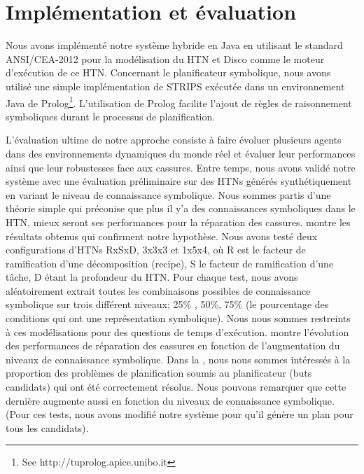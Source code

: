 \documentclass[a4paper,twoside,french]{article}
\begin{document}
	\section{Implémentation et évaluation}
	Nous avons implémenté notre système hybride en Java en utilisant le standard ANSI/CEA-2012 \cite{rich2009building} pour la modélisation du HTN et Disco \cite{rich2012using} comme le moteur d'exécution de ce HTN. Concernant le planificateur symbolique, nous avons utilisé une simple implémentation de STRIPS  exécutée dans un environnement Java de Prolog\footnote{See http://tuprolog.apice.unibo.it}. L'utilisation de Prolog facilite l'ajout de règles de raisonnement symboliques durant le processus de planification. 
	\par L'évaluation ultime de notre approche consiste à faire évoluer plusieurs agents dans des environnements dynamiques du monde réel et évaluer leur performances ainsi que leur robustesses face aux cassures. Entre temps, nous avons validé notre système avec une évaluation préliminaire sur des HTNs générés synthétiquement en variant le niveau de connaissance symbolique. Nous sommes partis d'une théorie simple qui préconise que plus il y'a des connaissances symboliques dans le HTN, mieux seront ses performances pour la réparation des cassures. 
		 montre les résultats obtenus qui confirment notre hypothèse. Nous avons testé deux configurations d'HTNs RxSxD, 3x3x3 et 1x5x4, où R est le facteur de ramification d'une décomposition (recipe), S le facteur de ramification d'une tâche, D étant la profondeur du HTN.  Pour chaque test, nous avons aléatoirement extrait toutes les combinaisons possibles de connaissance symbolique sur trois différent niveaux; 25\% , 50\%, 75\% (le pourcentage des conditions qui ont une représentation symbolique). Nous nous sommes restreints à ces modélisations pour des questions de temps d'exécution. 	 montre l'évolution des performances de réparation des cassures en fonction de l'augmentation du niveaux de connaissance symbolique. Dans la , nous nous sommes intéressés à la proportion des problèmes de planification soumis au planificateur (buts candidats) qui ont été correctement résolus. Nous pouvons remarquer que cette dernière augmente aussi en fonction du niveaux de connaissance symbolique. (Pour ces tests, nous avons modifié notre système pour qu'il génère un plan pour tous les candidats).
\end{document}
